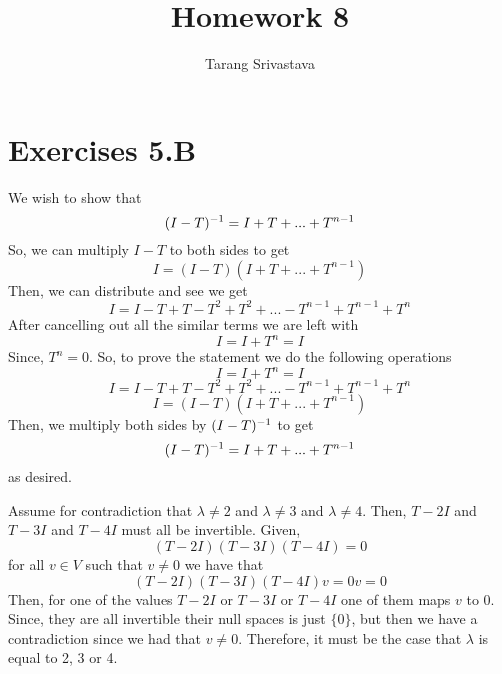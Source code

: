 \documentclass[10pt, twocolumn]{article}
\title{Homework 8}
\author{Tarang Srivastava}
\begin{document}
\makechaptertitle

\section{Exercises 5.B}
\begin{q}[1]
    We wish to show that 
    $$ (I - T)^{-1} = I + T + ... + T^{n - 1} $$
    So, we can multiply $ I - T $ to both sides to get 
    $$ I = (I - T)(I + T + ... + T^{n - 1}) $$
    Then, we can distribute and see we get 
    $$ I = I - T + T - T^2 + T^2 + ... - T^{n-1}  + T^{n-1} + T^{n} $$
    After cancelling out all the similar terms we are left with
    $$ I = I + T^{n} = I $$
    Since, $ T^n = 0 $. 
    So, to prove the statement we do the following operations
    $$ I = I + T^{n} = I $$
    $$ I = I - T + T - T^2 + T^2 + ... - T^{n-1}  + T^{n-1} + T^{n} $$
    $$ I = (I - T)(I + T + ... + T^{n - 1}) $$
    Then, we multiply both sides by $ (I - T)^{-1} $ to get 
    $$ (I - T)^{-1} = I + T + ... + T^{n - 1} $$
    as desired.
\end{q}
\begin{q}[2]
    Assume for contradiction that $ \lambda \neq 2 $ and $\lambda \neq 3 $ and $ \lambda \neq 4 $. 
    Then, $ T - 2I $ and $ T - 3I $ and $ T - 4I $ must all be invertible.
    Given,
    $$ (T - 2I)(T - 3I)(T - 4I) = 0 $$
    for all $ v \in V $ such that $ v \neq 0 $ we have that 
    $$ (T - 2I)(T - 3I)(T - 4I)v = 0v = 0 $$
    Then, for one of the values $ T - 2I $ or $ T - 3I $ or $ T - 4I $ one of them maps $ v $ to 0. 
    Since, they are all invertible their null spaces is just $ \{0\} $, but then we have a contradiction since we had that $ v \neq 0 $.
    Therefore, it must be the case that $ \lambda $ is equal to 2, 3 or 4.
\end{q}
\begin{q}[3]
     
\end{q}
\end{document}
